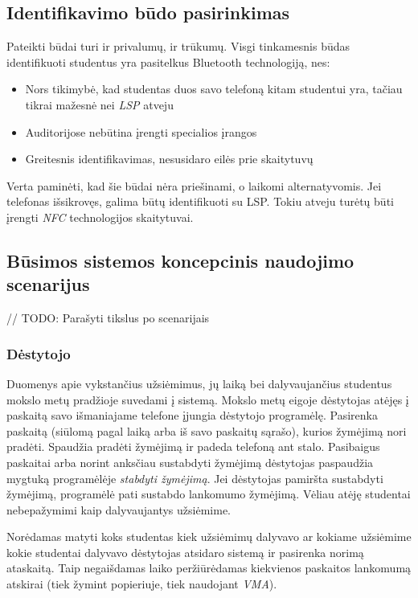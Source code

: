 \documentclass{VUMIFPSbakalaurinis}
\begin{document}
\subsection{Identifikavimo būdo pasirinkimas}

Pateikti būdai turi ir privalumų, ir trūkumų. Visgi tinkamesnis būdas identifikuoti studentus yra pasitelkus Bluetooth technologiją, nes:

\begin{itemize}
    \item Nors tikimybė, kad studentas duos savo telefoną kitam studentui yra, tačiau tikrai mažesnė nei \textit{LSP} atveju
	\item Auditorijose nebūtina įrengti specialios įrangos
	\item Greitesnis identifikavimas, nesusidaro eilės prie skaitytuvų
\end{itemize}

Verta paminėti, kad šie būdai nėra priešinami, o laikomi alternatyvomis. Jei telefonas išsikrovęs, galima būtų identifikuoti su LSP. Tokiu atveju turėtų būti įrengti \textit{NFC} technologijos skaitytuvai.

\subsection{Būsimos sistemos koncepcinis naudojimo scenarijus}

// TODO: Parašyti tikslus po scenarijais

\subsubsection{Dėstytojo}

Duomenys apie vykstančius užsiėmimus, jų laiką bei dalyvaujančius studentus mokslo metų pradžioje suvedami į sistemą. Mokslo metų eigoje dėstytojas atėjęs į paskaitą savo išmaniajame telefone įjungia dėstytojo programėlę. Pasirenka paskaitą (siūlomą pagal laiką arba iš savo paskaitų sąrašo), kurios žymėjimą nori pradėti. Spaudžia pradėti žymėjimą ir padeda telefoną ant stalo. Pasibaigus paskaitai arba norint anksčiau sustabdyti žymėjimą dėstytojas paspaudžia mygtuką programėlėje \textit{stabdyti žymėjimą}. Jei dėstytojas pamiršta sustabdyti žymėjimą, programėlė pati sustabdo lankomumo žymėjimą. Vėliau atėję studentai nebepažymimi kaip dalyvaujantys užsiėmime.

Norėdamas matyti koks studentas kiek užsiėmimų dalyvavo ar kokiame užsiėmime kokie studentai dalyvavo dėstytojas atsidaro sistemą ir pasirenka norimą ataskaitą. Taip negaišdamas laiko peržiūrėdamas kiekvienos paskaitos lankomumą atskirai (tiek žymint popieriuje, tiek naudojant \textit{VMA}).
\end{document}
